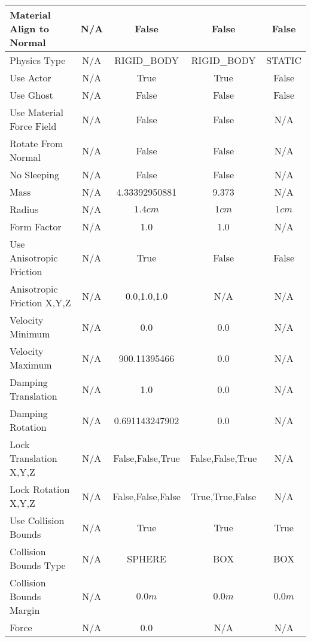 \begin{table}[htbp]
\begin{tabular}{ | l || c | c | c | c | }
Material Align to Normal   & N/A & False                            & False & False \\ \hline \hline
Physics Type               & N/A & RIGID\_BODY & RIGID\_BODY  & STATIC \\ \hline
Use Actor                  & N/A & True  & True  & False \\ \hline
Use Ghost                  & N/A & False & False & False \\ \hline
Use Material Force Field   & N/A & False & False & N/A \\ \hline
Rotate From Normal         & N/A & False & False & N/A \\ \hline
No Sleeping                & N/A & False & False & N/A \\ \hline
Mass                       & N/A & \cellcolor{lightblue} 4.33392950881  & 9.373 & N/A \\ \hline
Radius                     & N/A & $1.4cm$     & $1cm$ & $1cm$ \\ \hline
Form Factor                & N/A & 1.0         & 1.0   & N/A \\ \hline
Use Anisotropic Friction   & N/A & True        & False & False \\ \hline
Anisotropic Friction X,Y,Z & N/A & 0.0,1.0,1.0 & N/A   & N/A \\ \hline
Velocity Minimum           & N/A & 0.0                             & 0.0 & N/A \\ \hline
Velocity Maximum           & N/A & \cellcolor{lightblue} 900.11395466   & 0.0 & N/A \\ \hline
Damping Translation        & N/A & \cellcolor{lightblue} 1.0            & 0.0 & N/A \\ \hline
Damping Rotation           & N/A & \cellcolor{lightblue} 0.691143247902 & 0.0 & N/A \\ \hline
Lock Translation X,Y,Z     & N/A & False,False,True  & False,False,True  & N/A \\ \hline
Lock Rotation X,Y,Z        & N/A & False,False,False & True,True,False   & N/A \\ \hline
Use Collision Bounds       & N/A & True & True & True \\ \hline
Collision Bounds Type      & N/A & \cellcolor{lightblue} SPHERE & BOX & BOX \\ \hline
Collision Bounds Margin    & N/A & $0.0m$ & $0.0m$ & $0.0m$ \\ \hline \hline
Force                      & N/A & 0.0    & N/A    & N/A \\ \hline

\end{tabular}
\end{table}
